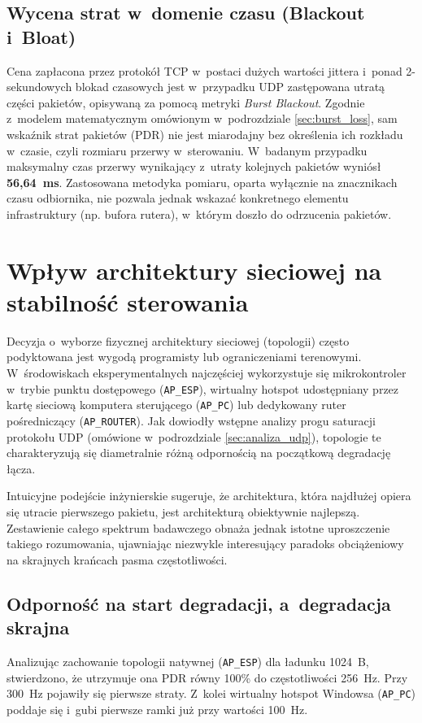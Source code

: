 \subsection{Wycena strat w~domenie czasu (Blackout i~Bloat)}
Cena zapłacona przez protokół TCP w~postaci dużych wartości jittera i~ponad 2-sekundowych blokad czasowych jest w~przypadku UDP zastępowana utratą części pakietów, opisywaną za pomocą metryki \textit{Burst Blackout}.
Zgodnie z~modelem matematycznym omówionym w~podrozdziale \ref{sec:burst_loss}, sam wskaźnik strat pakietów (PDR) nie jest miarodajny bez określenia ich rozkładu w~czasie, czyli rozmiaru przerwy w~sterowaniu.
W~badanym przypadku maksymalny czas przerwy wynikający z~utraty kolejnych pakietów wyniósł \textbf{56,64~ms}.
Zastosowana metodyka pomiaru, oparta wyłącznie na znacznikach czasu odbiornika, nie pozwala jednak wskazać konkretnego elementu infrastruktury (np. bufora rutera), w~którym doszło do odrzucenia pakietów.

\section{Wpływ architektury sieciowej na stabilność sterowania}
\label{sec:wplyw_topologii}

Decyzja o~wyborze fizycznej architektury sieciowej (topologii) często podyktowana jest wygodą programisty lub ograniczeniami terenowymi.
W~środowiskach eksperymentalnych najczęściej wykorzystuje się mikrokontroler w~trybie punktu dostępowego (\texttt{AP\_ESP}), wirtualny hotspot udostępniany przez kartę sieciową komputera sterującego (\texttt{AP\_PC}) lub dedykowany ruter pośredniczący (\texttt{AP\_ROUTER}).
Jak dowiodły wstępne analizy progu saturacji protokołu UDP (omówione w~podrozdziale \ref{sec:analiza_udp}), topologie te charakteryzują się diametralnie różną odpornością na początkową degradację łącza.

Intuicyjne podejście inżynierskie sugeruje, że architektura, która najdłużej opiera się utracie pierwszego pakietu, jest architekturą obiektywnie najlepszą.
Zestawienie całego spektrum badawczego obnaża jednak istotne uproszczenie takiego rozumowania, ujawniając niezwykle interesujący paradoks obciążeniowy na skrajnych krańcach pasma częstotliwości.

\subsection{Odporność na start degradacji, a~degradacja skrajna}
Analizując zachowanie topologii natywnej (\texttt{AP\_ESP}) dla ładunku 1024~B, stwierdzono, że utrzymuje ona PDR równy 100\% do częstotliwości 256~Hz.
Przy 300~Hz pojawiły się pierwsze straty.
Z~kolei wirtualny hotspot Windowsa (\texttt{AP\_PC}) poddaje się i~gubi pierwsze ramki już przy wartości 100~Hz.

